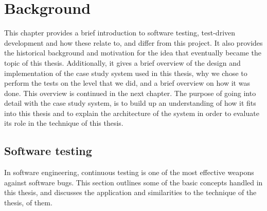 \chapter{Background}
\label{ch:background}
This chapter provides a brief introduction to software testing, test-driven development and how these relate to, and differ from this project. It also provides the historical background and motivation for the idea that eventually became the topic of this thesis. Additionally, it gives a brief overview of the design and implementation of the case study system used in this thesis, why we chose to perform the tests on the level that we did, and a brief overview on how it was done. This overview is continued in the next chapter. The purpose of going into detail with the case study system, is to build up an understanding of how it fits into this thesis and to explain the architecture of the system in order to evaluate its role in the technique of this thesis.

\section{Software testing}
In software engineering, continuous testing is one of the most effective weapons against software bugs. This section outlines some of the basic concepts handled in this thesis, and discusses the application and similarities to the technique of the thesis, of them.

